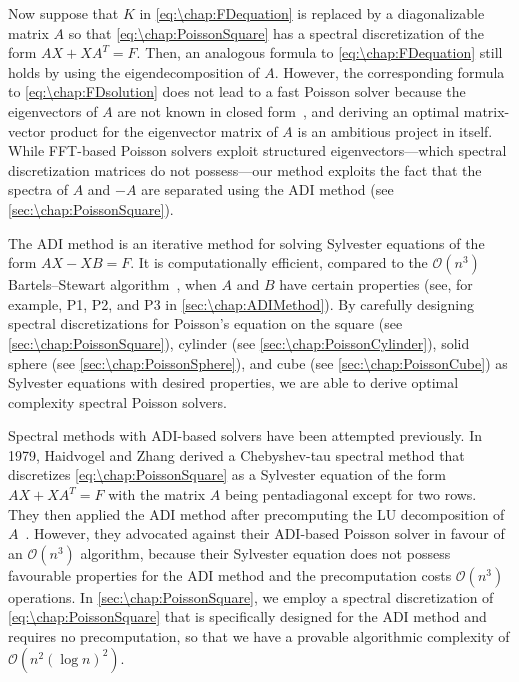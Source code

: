 Now suppose that $K$ in \cref{eq:\chap:FDequation} is replaced by a diagonalizable matrix $A$ so that \cref{eq:\chap:PoissonSquare} has a spectral discretization of the form $AX+XA^T = F$. Then, an analogous formula to \cref{eq:\chap:FDequation} still holds by using the eigendecomposition of $A$. However, the corresponding formula to \cref{eq:\chap:FDsolution} does not lead to a fast Poisson solver because the eigenvectors of $A$ are not known in closed form~\cite{Weideman_88_01}, and deriving an optimal matrix-vector product for the eigenvector matrix of $A$ is an ambitious project in itself. While FFT-based Poisson solvers exploit structured eigenvectors---which spectral discretization matrices do not possess---our method exploits the fact that the spectra of $A$ and $-A$ are separated using the ADI method (see \cref{sec:\chap:PoissonSquare}).

The ADI method is an iterative method for solving Sylvester equations of the form $AX-XB = F$. It is computationally efficient, compared to the $\mathcal{O}(n^3)$ Bartels--Stewart algorithm~\cite{Bartels_72_01}, when $A$ and $B$ have certain properties (see, for example, P1, P2, and P3 in \cref{sec:\chap:ADIMethod}). By carefully designing spectral discretizations for Poisson's equation on the square (see \cref{sec:\chap:PoissonSquare}), cylinder (see \cref{sec:\chap:PoissonCylinder}), solid sphere (see \cref{sec:\chap:PoissonSphere}), and cube (see \cref{sec:\chap:PoissonCube}) as Sylvester equations with desired properties, we are able to derive optimal complexity spectral Poisson solvers.

Spectral methods with ADI-based solvers have been attempted previously. In 1979, Haidvogel and Zhang derived a Chebyshev-tau spectral method that discretizes \cref{eq:\chap:PoissonSquare} as a Sylvester equation of the form $AX+XA^T=F$ with the matrix $A$ being pentadiagonal except for two rows. They then applied the ADI method after precomputing the LU decomposition of $A$~\cite{Haidvogel_79_01}. However, they advocated against their ADI-based Poisson solver in favour of an $\mathcal{O}(n^3)$ algorithm, because their Sylvester equation does not possess favourable properties for the ADI method and the precomputation costs $\mathcal{O}(n^3)$ operations. In \cref{sec:\chap:PoissonSquare}, we employ a spectral discretization of \cref{eq:\chap:PoissonSquare} that is specifically designed for the ADI method and requires no precomputation, so that we have a provable algorithmic complexity of $\mathcal{O}(n^2(\log n)^2)$.

